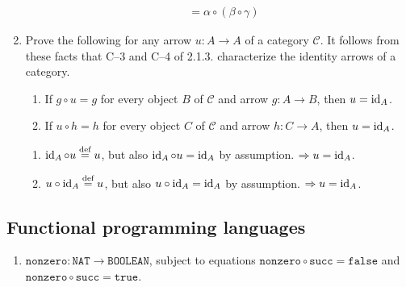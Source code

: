 \begin{enumerate}
\begin{solution}
\begin{align*}
                   & = \alpha \circ (\beta \circ \gamma)
              \end{align*}
          \end{solution}
    \item Prove the following for any arrow \(u : A \to A\) of a category \(\mathcal{C}\). It follows from these facts that C--3 and C--4 of 2.1.3. characterize the identity arrows of a category.
          \begin{enumerate}
              \item If \(g \circ u = g\) for every object \(B\) of \(\mathcal{C}\) and arrow \(g : A \to B\), then \(u = \operatorname{id}_A\).
              \item If \(u \circ h = h\) for every object \(C\) of \(\mathcal{C}\) and arrow \(h : C \to A\), then \(u = \operatorname{id}_A\).
          \end{enumerate}
          \begin{solution}\itemfix
              \begin{enumerate}
                  \item \(\operatorname{id}_A \circ u \stackrel{\text{def}}{=} u\), but also \(\operatorname{id}_A \circ u = \operatorname{id}_A\) by assumption. \(\Rightarrow u = \operatorname{id}_A\).
                  \item \(u \circ \operatorname{id}_A \stackrel{\text{def}}{=} u\), but also \(u \circ \operatorname{id}_A = \operatorname{id}_A\) by assumption. \(\Rightarrow u = \operatorname{id}_A\).
              \end{enumerate}
          \end{solution}
\end{enumerate}

\subsection{Functional programming languages}

\begin{enumerate}
    \item \(\texttt{nonzero}: \texttt{NAT} \to \texttt{BOOLEAN}\), subject to equations \(\texttt{nonzero} \circ \texttt{succ} = \texttt{false}\) and \(\texttt{nonzero} \circ \texttt{succ} = \texttt{true}\).
\end{enumerate}



